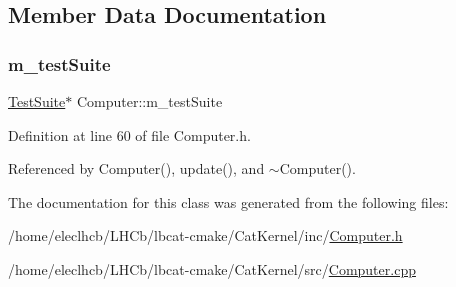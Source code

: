 \subsection{Member Data Documentation}
\mbox{\label{classComputer_a5418f176fa9fbd08356ad251f047adcd}} 
\subsubsection{\texorpdfstring{m\+\_\+test\+Suite}{m\_testSuite}}
{\footnotesize\ttfamily \hyperlink{classTestSuite}{Test\+Suite}$\ast$ Computer\+::m\+\_\+test\+Suite\hspace{0.3cm}{\ttfamily [private]}}



Definition at line 60 of file Computer.\+h.



Referenced by Computer(), update(), and $\sim$\+Computer().



The documentation for this class was generated from the following files\+:\begin{DoxyCompactItemize}
\item 
/home/eleclhcb/\+L\+H\+Cb/lbcat-\/cmake/\+Cat\+Kernel/inc/\hyperlink{Computer_8h}{Computer.\+h}\item 
/home/eleclhcb/\+L\+H\+Cb/lbcat-\/cmake/\+Cat\+Kernel/src/\hyperlink{Computer_8cpp}{Computer.\+cpp}\end{DoxyCompactItemize}
